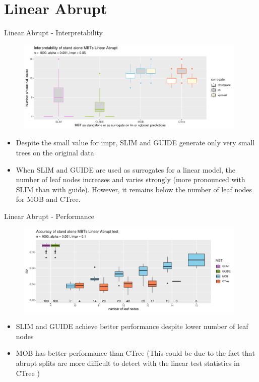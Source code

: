 \documentclass[9pt, xcolor=table]{beamer}
\begin{document}
\section{Linear Abrupt}
\begin{frame}{Linear Abrupt - Interpretability}

\begin{figure}
    \includegraphics[width=11cm]{Figures/simulations/batchtools/basic_scenarios/linear_abrupt/la_1000_int.pdf}
\end{figure}    
\begin{itemize}
    \item Despite the small value for impr, SLIM and GUIDE generate only very small trees on the original data 
    \item When SLIM and GUIDE are used as surrogates for a linear model, the number of leaf nodes increases and varies strongly (more pronounced with SLIM than with guide). However, it remains below the number of leaf nodes for MOB and CTree.
\end{itemize}
\end{frame}


\begin{frame}{Linear Abrupt - Performance}
\begin{figure}
    \includegraphics[width=11cm]{Figures/simulations/batchtools/basic_scenarios/linear_abrupt/la_1000_standalone_r2_test.pdf}
\end{figure}     
\begin{itemize}
    \item SLIM and GUIDE achieve better performance despite lower number of leaf nodes
    \item MOB has better performance than CTree (This could be due to the fact that abrupt splits are more difficult to detect with the linear test statistics in CTree \citep{Schlosser.2019})
\end{itemize}
\end{frame}
\end{document}
